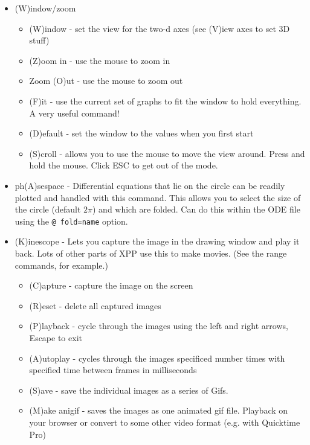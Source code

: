 \documentclass{article}
\begin{document}
\begin{itemize}
\begin{itemize}
\item (N)o dir. field - don't draw it
\item (C)olorize - Use the parameters from (N)umerics (C)olor code to colorize the whole phase plane. A good grid is 100.
\item (S)caled Dir.Fld - direction field with unit length.
\end{itemize}
\item (W)indow/zoom 
\begin{itemize}
\item (W)indow - set the view for the two-d axes (see (V)iew axes to set 3D stuff)
\item (Z)oom in - use the mouse to zoom in
\item Zoom (O)ut - use the mouse to zoom out
\item (F)it - use the current set of graphs to fit the window to hold everything. A very useful command!
\item (D)efault - set the window to the values when you first start
\item (S)croll  -  allows you to use the mouse to move the view around. Press and hold the mouse.  Click ESC to get out of the mode. 
\end{itemize}
\item ph(A)sespace - Differential equations that lie on the circle can be readily plotted and handled with this command. This allows you to select the size of the circle (default $2\pi$) and which are folded. Can do this within the ODE file using the {\tt @ fold=name} option.
\item (K)inescope - Lets you capture the image in the drawing window and play it back. Lots of other parts of XPP use this to make movies. (See the range commands, for example.) 
\begin{itemize}
\item (C)apture - capture the image on the screen
\item (R)eset - delete all captured images
\item (P)layback - cycle through the images using the left and right arrows, Escape to exit
\item (A)utoplay - cycles through the images specificed number times with specified time between frames in milliseconds
\item (S)ave - save the individual images as a series of Gifs. 
\item (M)ake anigif - saves the images as one animated gif file. Playback on your browser or convert to some other video format (e.g. with Quicktime Pro)

\end{itemize}
\end{itemize}
\end{document}
